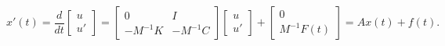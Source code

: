 \documentclass{article}
\begin{document}
\begin{equation}
x'(t) =\dfrac{d}{dt} \begin{bmatrix} u \\ u' \end{bmatrix} = \begin{bmatrix} 0 & I \\ -M^{-1}K & -M^{-1}C \end{bmatrix}\begin{bmatrix} u \\ u' \end{bmatrix} + \begin{bmatrix} 0 \\ M^{-1}F(t) \end{bmatrix} = Ax(t) + f(t).
\end{equation}




\end{document}
